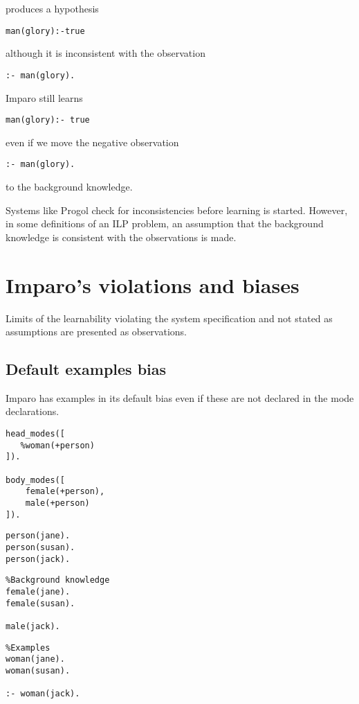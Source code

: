 produces a hypothesis
\begin{lstlisting}
man(glory):-true
\end{lstlisting}
although it is inconsistent with the observation
\begin{lstlisting}
:- man(glory).
\end{lstlisting}

Imparo still learns
\begin{lstlisting}
man(glory):- true
\end{lstlisting}
even if we move the negative observation
\begin{lstlisting}
:- man(glory).
\end{lstlisting}
to the background knowledge.

Systems like Progol check for inconsistencies before learning is started. However, in some definitions of an ILP problem, an assumption that the background knowledge is consistent with the observations is made.

\section{Imparo's violations and biases}
Limits of the learnability violating the system specification and not stated as assumptions are presented as observations.

\subsection{Default examples bias}
Imparo has examples in its default bias even if these are not declared in the mode declarations.

\begin{minipage}[t]{.25\textwidth}
\begin{lstlisting}
head_modes([
   %woman(+person)
]).

body_modes([
    female(+person),
    male(+person)
]).\end{lstlisting}
\end{minipage}
\begin{minipage}[t]{.20\textwidth}
\begin{lstlisting}
person(jane).
person(susan).
person(jack).
\end{lstlisting}
\end{minipage}
\begin{minipage}[t]{.30\textwidth}
\begin{lstlisting}
%Background knowledge
female(jane).
female(susan).

male(jack).
\end{lstlisting}
\end{minipage}
\begin{minipage}[t]{.25\textwidth}
\begin{lstlisting}
%Examples
woman(jane).
woman(susan).

:- woman(jack).
\end{lstlisting}
\end{minipage}


